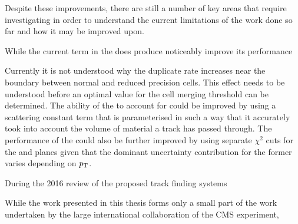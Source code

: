 Despite these improvements, there are still a number of key areas that require investigating in order to understand the current limitations of the work done so far and how it may be improved upon.

While the current \MS term in the \KF does produce noticeably improve its performance

Currently it is not understood why the duplicate rate increases near the boundary between normal and reduced precision \HT cells.
This effect needs to be understood before an optimal value for the cell merging threshold can be determined.
The ability of the \KF to account for \MS could be improved by using a scattering constant term that is parameterised in such a way that it accurately took into account the volume of material a track has passed through.
The performance of the \KF could also be further improved by using separate \KF $\chi^{2}$ cuts for the \rphi and \rz planes given that the dominant uncertainty contribution for the former varies depending on $p_{\mathrm{T}}$.

During the 2016 review of the proposed track finding systems 

While the work presented in this thesis forms only a small part of the work undertaken by the large international collaboration of the CMS experiment, 